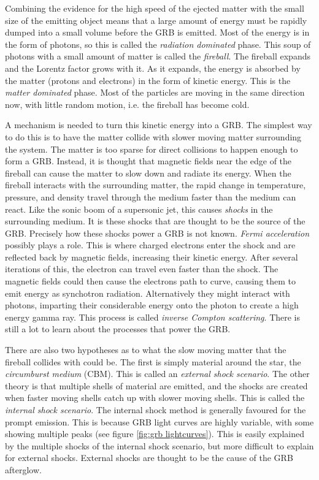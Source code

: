\documentclass[11pt]{cuthesis}
\begin{document}
Combining the evidence for the high speed of the ejected matter with the small size of the emitting object means that a large amount of energy must be rapidly dumped into a small volume before the GRB is emitted. Most of the energy is in the form of photons, so this is called the \textit{radiation dominated} phase. This soup of photons with a small amount of matter is called the \textit{fireball}. The fireball expands and the Lorentz factor grows with it. As it expands, the energy is absorbed by the matter (protons and electrons) in the form of kinetic energy. This is the \textit{matter dominated} phase. Most of the particles are moving in the same direction now, with little random motion, i.e. the fireball has become cold. 

A mechanism is needed to turn this kinetic energy into a GRB. The simplest way to do this is to have the matter collide with slower moving matter surrounding the system. The matter is too sparse for direct collisions to happen enough to form a GRB. Instead, it is thought that magnetic fields near the edge of the fireball can cause the matter to slow down and radiate its energy. When the fireball interacts with the surrounding matter, the rapid change in temperature, pressure, and density travel through the medium faster than the medium can react. Like the sonic boom of a supersonic jet, this causes \textit{shocks} in the surrounding medium. It is these shocks that are thought to be the source of the GRB. Precisely how these shocks power a GRB is not known. \textit{Fermi acceleration} possibly plays a role. This is where charged electrons enter the shock and are reflected back by magnetic fields, increasing their kinetic energy. After several iterations of this, the electron can travel even faster than the shock. The magnetic fields could then cause the electrons path to curve, causing them to emit energy as synchotron radiation. Alternatively they might interact with photons, imparting their considerable energy onto the photon to create a high energy gamma ray. This process is called \textit{inverse Compton scattering}. There is still a lot to learn about the processes that power the GRB.

There are also two hypotheses as to what the slow moving matter that the fireball collides with could be. The first is simply material around the star, the \textit{circumburst medium} (CBM). This is called an \textit{external shock scenario}. The other theory is that multiple shells of material are emitted, and the shocks are created when faster moving shells catch up with slower moving shells. This is called the \textit{internal shock scenario}. The internal shock method is generally favoured for the prompt emission. This is because GRB light curves are highly variable, with some showing multiple peaks (see figure \ref{fig:grb lightcurves}). This is easily explained by the multiple shocks of the internal shock scenario, but more difficult to explain for external shocks. External shocks are thought to be the cause of the GRB afterglow.
\end{document}
